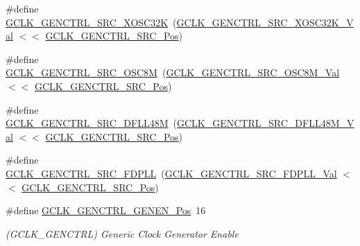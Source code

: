 \begin{DoxyCompactItemize}
\item 
\#define \mbox{\hyperlink{group___s_a_m_d21___g_c_l_k_gaf2db90c4ecefc9b935dd47d82968eb27}{G\+C\+L\+K\+\_\+\+G\+E\+N\+C\+T\+R\+L\+\_\+\+S\+R\+C\+\_\+\+X\+O\+S\+C32K}}~(\mbox{\hyperlink{group___s_a_m_d21___g_c_l_k_ga087326ba1d0ac766f2835e5460c72ef0}{G\+C\+L\+K\+\_\+\+G\+E\+N\+C\+T\+R\+L\+\_\+\+S\+R\+C\+\_\+\+X\+O\+S\+C32\+K\+\_\+\+Val}}  $<$$<$ \mbox{\hyperlink{group___s_a_m_d21___g_c_l_k_ga3ca6fb0d36a0f1194282d2517b22965f}{G\+C\+L\+K\+\_\+\+G\+E\+N\+C\+T\+R\+L\+\_\+\+S\+R\+C\+\_\+\+Pos}})
\item 
\#define \mbox{\hyperlink{group___s_a_m_d21___g_c_l_k_ga53a17a2e7173521f90740b1f632c7863}{G\+C\+L\+K\+\_\+\+G\+E\+N\+C\+T\+R\+L\+\_\+\+S\+R\+C\+\_\+\+O\+S\+C8M}}~(\mbox{\hyperlink{group___s_a_m_d21___g_c_l_k_ga7b00616bd4afa72d171e9ad317b208ac}{G\+C\+L\+K\+\_\+\+G\+E\+N\+C\+T\+R\+L\+\_\+\+S\+R\+C\+\_\+\+O\+S\+C8\+M\+\_\+\+Val}}    $<$$<$ \mbox{\hyperlink{group___s_a_m_d21___g_c_l_k_ga3ca6fb0d36a0f1194282d2517b22965f}{G\+C\+L\+K\+\_\+\+G\+E\+N\+C\+T\+R\+L\+\_\+\+S\+R\+C\+\_\+\+Pos}})
\item 
\#define \mbox{\hyperlink{group___s_a_m_d21___g_c_l_k_gaa23918b1d8f76e45db3cbec26eb70973}{G\+C\+L\+K\+\_\+\+G\+E\+N\+C\+T\+R\+L\+\_\+\+S\+R\+C\+\_\+\+D\+F\+L\+L48M}}~(\mbox{\hyperlink{group___s_a_m_d21___g_c_l_k_ga70357963bac751c47a0b097568f1ec34}{G\+C\+L\+K\+\_\+\+G\+E\+N\+C\+T\+R\+L\+\_\+\+S\+R\+C\+\_\+\+D\+F\+L\+L48\+M\+\_\+\+Val}}  $<$$<$ \mbox{\hyperlink{group___s_a_m_d21___g_c_l_k_ga3ca6fb0d36a0f1194282d2517b22965f}{G\+C\+L\+K\+\_\+\+G\+E\+N\+C\+T\+R\+L\+\_\+\+S\+R\+C\+\_\+\+Pos}})
\item 
\#define \mbox{\hyperlink{group___s_a_m_d21___g_c_l_k_gad4a5c9ae337e9e8572d765dc77310ea7}{G\+C\+L\+K\+\_\+\+G\+E\+N\+C\+T\+R\+L\+\_\+\+S\+R\+C\+\_\+\+F\+D\+P\+LL}}~(\mbox{\hyperlink{group___s_a_m_d21___g_c_l_k_ga87f8f30846939c09a6d982c14bf3aa3c}{G\+C\+L\+K\+\_\+\+G\+E\+N\+C\+T\+R\+L\+\_\+\+S\+R\+C\+\_\+\+F\+D\+P\+L\+L\+\_\+\+Val}}    $<$$<$ \mbox{\hyperlink{group___s_a_m_d21___g_c_l_k_ga3ca6fb0d36a0f1194282d2517b22965f}{G\+C\+L\+K\+\_\+\+G\+E\+N\+C\+T\+R\+L\+\_\+\+S\+R\+C\+\_\+\+Pos}})
\item 
\#define \mbox{\hyperlink{group___s_a_m_d21___g_c_l_k_gacf206c291132d560c6f857c74d042b09}{G\+C\+L\+K\+\_\+\+G\+E\+N\+C\+T\+R\+L\+\_\+\+G\+E\+N\+E\+N\+\_\+\+Pos}}~16
\begin{DoxyCompactList}\small\item\em (G\+C\+L\+K\+\_\+\+G\+E\+N\+C\+T\+RL) Generic Clock Generator Enable \end{DoxyCompactList}\item 

\end{DoxyCompactItemize}
